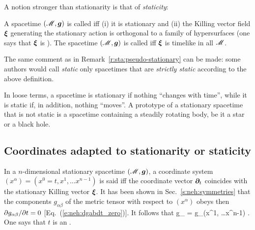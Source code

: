 A notion stronger than stationarity is that of \emph{staticity}:

\begin{greybox}
A spacetime $(\mathscr{M},\bm{g})$ is called 
iff (i) it is stationary and (ii) the Killing vector field $\bm{\xi}$
generating the stationary action is orthogonal to a family of hypersurfaces
(one says that $\bm{\xi}$ is ).
The spacetime $(\mathscr{M},\bm{g})$ is called 
iff $\bm{\xi}$ is timelike in all $\mathscr{M}$.
\end{greybox}

\begin{remark}
The same comment as in Remark~\ref{r:sta:pseudo-stationary} can be made: some authors
would call \emph{static} only spacetimes that are
\emph{strictly static} according to the above definition.
\end{remark}

In loose terms, a spacetime is stationary if nothing ``changes with time'', while
it is static if, in addition, nothing ``moves''. A prototype of a stationary
spacetime that is not static is a spacetime containing a steadily rotating
body, be it a star or a black hole.


\subsection{Coordinates adapted to stationarity or staticity}

In a $n$-dimensional stationary spacetime $(\mathscr{M},\bm{g})$, a coordinate system $(x^\alpha) = (x^0=t, x^1, \ldots  x^{n-1})$
is said  iff the coordinate vector
$\bm{\partial}_t$ coincides with the stationary Killing vector $\bm{\xi}$.
It has been shown in Sec.~\ref{s:neh:symmetries} that the components $g_{\alpha\beta}$
of the metric tensor with respect to $(x^\alpha)$ obeys then ${\partial g_{\alpha\beta}}/{\partial t} = 0$
[Eq.~(\ref{e:neh:dgabdt_zero})]. It follows that
\be
   g_{\alpha\beta}  = g_{\alpha\beta}(x^1, \ldots  x^{n-1}) .
\ee
One says that $t$ is an .

